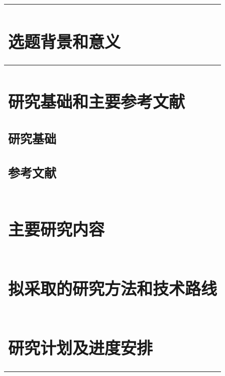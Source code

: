 \documentclass{XaufeThesisTemplate}
\begin{document}




\begin{longtable}{|p{\textwidth}|}
  \hline
  \endfoot
  \hline
  \endhead
  \section{选题背景和意义}
  \\ \hline
  \section{研究基础和主要参考文献}
    \subsection{研究基础}
    \subsection{参考文献}
      
      \nocite{*}
  \\ \hline
  \section{主要研究内容}

  \\ \hline
  \section{拟采取的研究方法和技术路线}
  \\ \hline
  \section{研究计划及进度安排}
  \\ \hline
  
\end{longtable}
\vspace{-0.5cm}
\begin{tablenotes}
  \item {}
\end{tablenotes}
\end{document}
